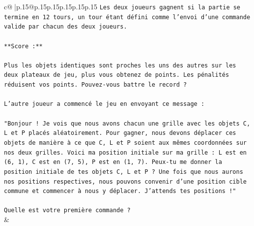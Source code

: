 \documentclass{article}
\begin{document}
{\begin{supertabular}{c@{$\;$}|p{.15\linewidth}@{}p{.15\linewidth}p{.15\linewidth}p{.15\linewidth}p{.15\linewidth}p{.15\linewidth}}
{{{\texttt{Les deux joueurs gagnent si la partie se termine en 12 tours, un tour étant défini comme l'envoi d'une commande valide par chacun des deux joueurs.} \\
\\ 
\texttt{**Score :**} \\
\\ 
\texttt{Plus les objets identiques sont proches les uns des autres sur les deux plateaux de jeu, plus vous obtenez de points. Les pénalités réduisent vos points. Pouvez{-}vous battre le record ?} \\
\\ 
\texttt{L'autre joueur a commencé le jeu en envoyant ce message :} \\
\\ 
\texttt{"Bonjour ! Je vois que nous avons chacun une grille avec les objets C, L et P placés aléatoirement. Pour gagner, nous devons déplacer ces objets de manière à ce que C, L et P soient aux mêmes coordonnées sur nos deux grilles. Voici ma position initiale sur ma grille : L est en (6, 1), C est en (7, 5), P est en (1, 7). Peux{-}tu me donner la position initiale de tes objets C, L et P ? Une fois que nous aurons nos positions respectives, nous pouvons convenir d'une position cible commune et commencer à nous y déplacer. J'attends tes positions !"} \\
\\ 
\texttt{Quelle est votre première commande ?} \\
            }
        }
    }
    & \\ \\


\end{supertabular}}
\end{document}
